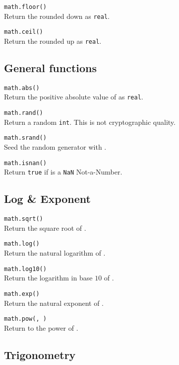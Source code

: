 \hangpar \texttt{math.floor(}\texttt{)} \\
Return the rounded down  as \texttt{real}.

\hangpar \texttt{math.ceil(}\texttt{)} \\
Return the rounded up  as \texttt{real}.

\subsection*{General functions}

\hangpar \texttt{math.abs(}\texttt{)} \\
Return the positive absolute value of  as \texttt{real}.

\hangpar \texttt{math.rand()} \\
Return a random \texttt{int}. This is not cryptographic quality.

\hangpar \texttt{math.srand(}\texttt{)} \\
Seed the random generator with .

\hangpar \texttt{math.isnan(}\texttt{)} \\
Return \texttt{true} if  is a \texttt{NaN} Not-a-Number.

\subsection*{Log \& Exponent}

\hangpar \texttt{math.sqrt(}\texttt{)}\\
Return the square root of .

\hangpar \texttt{math.log(}\texttt{)}\\
Return the natural logarithm of .

\hangpar \texttt{math.log10(}\texttt{)}\\
Return the logarithm in base $10$ of .

\hangpar \texttt{math.exp(}\texttt{)}\\
Return the natural exponent of .

\hangpar \texttt{math.pow(}\texttt{, }\texttt{)}\\
Return  to the power of .


\subsection*{Trigonometry}

